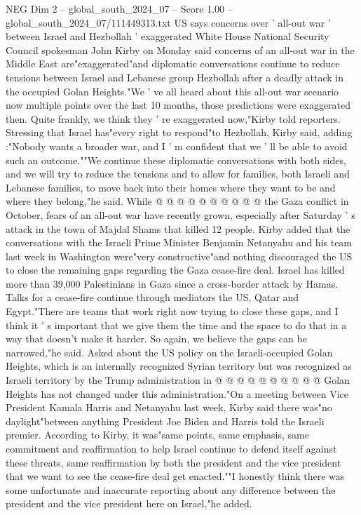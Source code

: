 \begin{textsample}{NEG Dim 2 – global\_south\_2024\_07 – Score 1.00 – global\_south\_2024\_07/111449313.txt}  \label{ex:f2_neg_282}
US says concerns over ' all-out war ' between Israel and Hezbollah ' exaggerated White House National Security Council spokesman John Kirby on Monday said concerns of an all-out war in the Middle East are"exaggerated"and diplomatic conversations continue to reduce tensions between Israel and Lebanese group Hezbollah after a deadly attack in the occupied Golan Heights."We ' ve all heard about this all-out war scenario now multiple points over the last 10 months, those predictions were exaggerated then.
Quite frankly, we think they ' re exaggerated now,"Kirby told reporters.
Stressing that Israel has"every right to respond"to Hezbollah, Kirby said, adding :"Nobody wants a broader war, and I ' m confident that we ' ll be able to avoid such an outcome.""We continue these diplomatic conversations with both sides, and we will try to reduce the tensions and to allow for families, both Israeli and Lebanese families, to move back into their homes where they want to be and where they belong,"he said.
While @ @ @ @ @ @ @ @ @ @ the Gaza conflict in October, fears of an all-out war have recently grown, especially after Saturday ' s attack in the town of Majdal Shams that killed 12 people.
Kirby added that the conversations with the Israeli Prime Minister Benjamin Netanyahu and his team last week in Washington were"very constructive"and nothing discouraged the US to close the remaining gaps regarding the Gaza cease-fire deal.
Israel has killed more than 39,000 Palestinians in Gaza since a cross-border attack by Hamas.
Talks for a cease-fire continue through mediators the US, Qatar and Egypt."There are teams that work right now trying to close these gaps, and I think it ' s important that we give them the time and the space to do that in a way that doesn't make it harder.
So again, we believe the gaps can be narrowed,"he said.
Asked about the US policy on the Israeli-occupied Golan Heights, which is an internally recognized Syrian territory but was recognized as Israeli territory by the Trump administration in @ @ @ @ @ @ @ @ @ @ Golan Heights has not changed under this administration."On a meeting between Vice President Kamala Harris and Netanyahu last week, Kirby said there was"no daylight"between anything President Joe Biden and Harris told the Israeli premier.
According to Kirby, it was"same points, same emphasis, same commitment and reaffirmation to help Israel continue to defend itself against these threats, same reaffirmation by both the president and the vice president that we want to see the cease-fire deal get enacted.""I honestly think there was some unfortunate and inaccurate reporting about any difference between the president and the vice president here on Israel,"he added.

\end{textsample}
